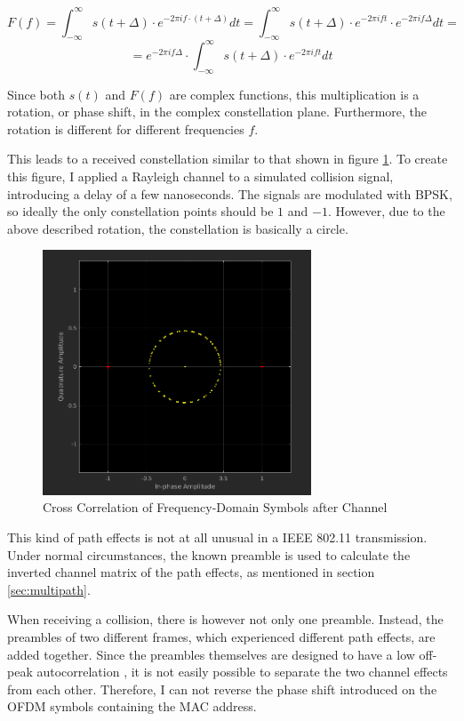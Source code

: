 $$ F(f) = \int_{-\infty}^{\infty} s(t + \Delta) \cdot e^{-2 \pi i f \cdot (t + \Delta)} dt = \int_{-\infty}^{\infty} s(t + \Delta) \cdot e^{-2 \pi i f t} \cdot e^{-2 \pi i f \Delta} dt = $$
$$ = e^{-2 \pi i f \Delta} \cdot \int_{-\infty}^{\infty} s(t + \Delta) \cdot e^{-2 \pi i f t} dt $$\vspace{0cm}

Since both $ s(t) $ and $ F(f) $ are complex functions, this multiplication is a rotation, or phase shift, in the complex constellation plane. Furthermore, the rotation is different for different frequencies $ f $.

This leads to a received constellation similar to that shown in figure \ref{fig:freqd-corr}. To create this figure, I applied a Rayleigh channel \cite{sklar1997} to a simulated collision signal, introducing a delay of a few nanoseconds. The signals are modulated with BPSK, so ideally the only constellation points should be $ 1 $ and $ -1 $. However, due to the above described rotation, the constellation is basically a circle.

\begin{figure}[ht]
	\centering
	\includegraphics[width=8cm]{gfx/images/freqd-correlation}
	\caption{Cross Correlation of Frequency-Domain Symbols after Channel}
	\label{fig:freqd-corr}
\end{figure}

This kind of path effects is not at all unusual in a IEEE 802.11 transmission. Under normal circumstances, the known preamble is used to calculate the inverted channel matrix of the path effects, as mentioned in section \ref{sec:multipath}.

When receiving a collision, there is however not only one preamble. Instead, the preambles of two different frames, which experienced different path effects, are added together. Since the preambles themselves are designed to have a low off-peak autocorrelation \cite{ieee2012}, it is not easily possible to separate the two channel effects from each other. Therefore, I can not reverse the phase shift introduced on the OFDM symbols containing the MAC address.

